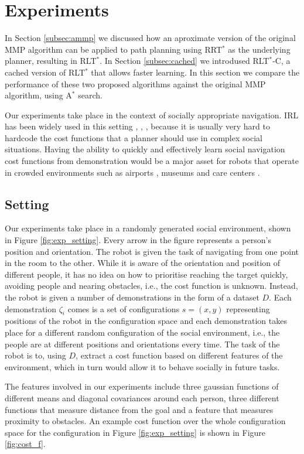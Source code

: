 \documentclass{article}  %
\begin{document}
\section{Experiments}
	In Section \ref{subsec:ammp} we discussed how an aproximate version of the original MMP algorithm can be applied to path planning using RRT$^*$ as the underlying planner, resulting in RLT$^*$. In Section \ref{subsec:cached} we introdused RLT$^*$-C, a cached version of RLT$^*$ that allows faster learning. In this section we compare the performance of these two proposed algorithms against the original MMP algorithm, using A$^*$ search.
	
	Our experiments take place in the context of socially appropriate navigation. IRL has been widely used in this setting \cite{okallearning}, \cite{henry2010learning}, \cite{vasquez2014inverse}, because it is usually very hard to hardcode the cost functions that a planner should use in complex social situations. Having the ability to quickly and effectively learn social navigation cost functions from demonstration would be a major asset for robots that operate in crowded environments such as airports \cite{triebel2015spencer}, museums \cite{thrun1999minerva} and care centers \cite{shiarlis2015teresa}.
	\subsection{Setting}
	Our experiments take place in a randomly generated social environment, shown in Figure \ref{fig:exp_setting}. Every arrow in the figure represents a person's position and orientation. The robot is given the task of navigating from one point in the room to the other. While it is aware of the orientation and position of different people, it has no idea on how to prioritise reaching the target quickly, avoiding people and nearing obstacles, i.e., the cost function is unknown. Instead, the robot is given a number of demonstrations in the form of a dataset $D$. Each demonstration $\zeta_i$ comes is a set of configurations $s = (x,y)$ representing positions of the robot in the configuration space and each demonstration takes place for a different random configuration of the social environment, i.e., the people are at different positions and orientations every time. The task of the robot is to, using $D$, extract a cost function based on different features of the environment, which in turn would allow it to behave socially in future tasks.

	The features involved in our experiments include three gaussian functions of different means and diagonal covariances around each person, three different functions that measure distance from the goal and a feature that measures proximity to obstacles. An example cost function over the whole configuration space for the configuration in Figure \ref{fig:exp_setting}  is shown in Figure \ref{fig:cost_f}.
\end{document}
